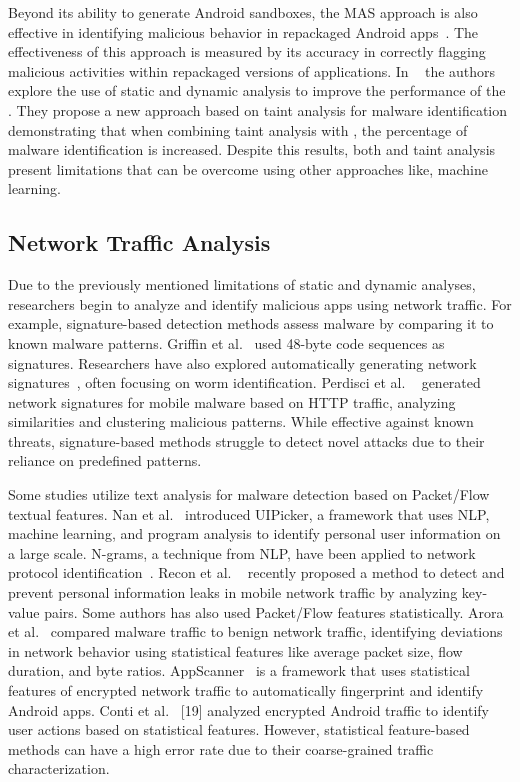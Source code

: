 Beyond its ability to generate Android sandboxes, the MAS approach is also effective in identifying malicious behavior in repackaged Android apps~\cite{DBLP:conf/wcre/BaoLL18}. The effectiveness of this approach is measured by its accuracy in correctly flagging malicious activities within repackaged versions of applications. In ~\cite{DBLP:jourals/jjc/Handrick22} the authors explore the use of static and dynamic analysis to improve the performance of the \mas. They propose a new approach based on taint analysis for malware identification demonstrating that when combining taint analysis with \mas, the percentage of malware identification is increased. Despite this results, both \mas and taint analysis present limitations that can be overcome using other approaches like, machine learning.

\subsection{Network Traffic Analysis}

Due to the previously mentioned limitations of static and dynamic analyses, researchers begin to analyze and identify malicious apps using network traffic. For example, signature-based detection methods assess malware by comparing it to known malware patterns. Griffin et al.~\cite{Griffin2009}  used 48-byte code sequences as signatures. Researchers have also explored automatically generating network signatures~\cite{PolygraphNewsome2005, Singh2004, Yegneswaran2005}, often focusing on worm identification. Perdisci et al. ~\cite{Perdisci2010} generated network signatures for mobile malware based on HTTP traffic, analyzing similarities and clustering malicious patterns. While effective against known threats, signature-based methods struggle to detect novel attacks due to their reliance on predefined patterns.

Some studies utilize text analysis for malware detection based on Packet/Flow textual features. Nan et al.~\cite{yuhong:usenix-2015} introduced UIPicker, a framework that uses NLP, machine learning, and program analysis to identify personal user information on a large scale. N-grams, a technique from NLP, have been applied to network protocol identification~\cite{YunWang2016}. Recon et al. ~\cite{ren:mobisys-2016} recently proposed a method to detect and prevent personal information leaks in mobile network traffic by analyzing key-value pairs. Some authors has also used Packet/Flow features statistically. Arora et al.~\cite{arora:ngmast-2014} compared malware traffic to benign network traffic, identifying deviations in network behavior using statistical features like average packet size, flow duration, and byte ratios. AppScanner~\cite{taylor:eurosp-2016} is a framework that uses statistical features of encrypted network traffic to automatically fingerprint and identify Android apps. Conti et al.~\cite{Conti2016} [19] analyzed encrypted Android traffic to identify user actions based on statistical features. However, statistical feature-based methods can have a high error rate due to their coarse-grained traffic characterization.

